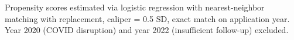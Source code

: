 \begin{table}[t]
\begin{minipage}{\linewidth}
Propensity scores estimated via logistic regression with nearest-neighbor matching with replacement, caliper = 0.5 SD, exact match on application year. Year 2020 (COVID disruption) and year 2022 (insufficient follow-up) excluded.\\
\end{minipage}
\end{table}

